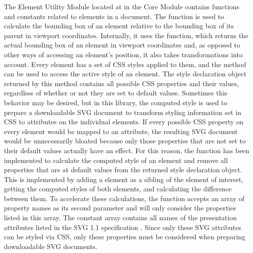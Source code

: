 The Element Utility Module located at  in the Core Module contains functions and constants related to elements in a document.
The  function is used to calculate the bounding box of an element relative to the bounding box of its parent in viewport coordinates.
Internally, it uses the  function, which returns the actual bounding box of an element in viewport coordinates and, as opposed to other ways of accessing an element's position, it also takes transformations into account.
Every element has a set of CSS styles applied to them, and the  method can be used to access the active style of an element.
The style declaration object returned by this method contains all possible CSS properties and their values, regardless of whether or not they are set to default values.
Sometimes this behavior may be desired, but in this library, the computed style is used to prepare a downloadable SVG document to transform styling information set in CSS to attributes on the individual elements.
If every possible CSS property on every element would be mapped to an attribute, the resulting SVG document would be unnecessarily bloated because only those properties that are not set to their default values actually have an effect.
For this reason, the  function has been implemented to calculate the computed style of an element and remove all properties that are at default values from the returned style declaration object.
This is implemented by adding a  element as a sibling of the element of interest, getting the computed styles of both elements, and calculating the difference between them.
To accelerate these calculations, the  function accepts an array of property names as its second parameter and will only consider the properties listed in this array.
The constant  array contains all names of the presentation attributes listed in the SVG 1.1 specification \parencite{SVG11}.
Since only these SVG attributes can be styled via CSS, only these properties must be considered when preparing downloadable SVG documents.

